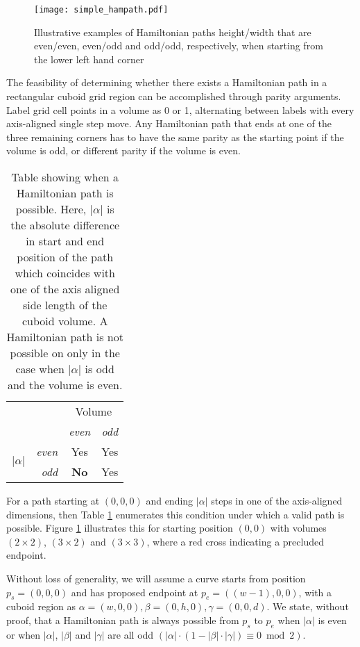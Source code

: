\begin{figure}[h]
  \centering
  \texttt{[image: simple\_hampath.pdf]}
  \caption{ Illustrative examples of Hamiltonian paths height/width that are even/even, even/odd and odd/odd, respectively,
            when starting from the lower left hand corner }
  \label{fig:exampleHampath}
\end{figure}


The feasibility of determining whether there exists a Hamiltonian path in a rectangular cuboid
grid region can be accomplished through parity arguments.
Label grid cell points in a volume as 0 or 1,
alternating between labels with every axis-aligned single step move.
Any Hamiltonian path that ends at one of the three remaining corners has to have the same parity as the starting point if the
volume is odd, or different parity if the volume is even.

\begin{table}[h]
  \centering
  \begin{tabular}[t]{cr|cc}
    \multicolumn{2}{c}{ \multirow{2}{*}{Path Possible} } & \multicolumn{2}{c}{Volume} \\
    & & \textit{even} & \textit{odd} \\
    \hline
      \multirow{2}{*}{ $|\alpha|$ } & \textit{even} & Yes & Yes \\
       & \textit{odd} & \textbf{No} & Yes \\
     \hline
  \end{tabular}
  \caption{ Table showing when a Hamiltonian path is possible. Here, $|\alpha|$ is the absolute difference in start and end position of the path which
            coincides with one of the axis aligned side length of the cuboid volume. A Hamiltonian path is not possible on only in the case
            when $|\alpha|$ is odd and the volume is even. }
  \label{table:pathTable}
\end{table}


For a path starting at $(0,0,0)$ and ending $|\alpha|$ steps in one of the axis-aligned dimensions,
then Table \ref{table:pathTable} enumerates this condition under which a valid path is possible.
Figure \ref{fig:exampleHampath} illustrates this for starting position $(0,0)$ with volumes $(2 \times 2)$, $(3 \times 2)$ and $(3 \times 3)$,
where a red cross indicating a precluded endpoint.

Without loss of generality, we will assume a curve starts from position $p_s=(0,0,0)$ and has proposed
endpoint at $p_e=((w-1),0,0)$, with a cuboid region as $\alpha = (w,0,0), \beta = (0,h,0), \gamma = (0,0,d)$.
We state, without proof, that
a Hamiltonian path is always possible from $p_s$ to $p_e$ when $|\alpha|$ is even or when $|\alpha|$, $|\beta|$ and $|\gamma|$
are all odd  $(|\alpha| \cdot (1 - |\beta| \cdot |\gamma|) \equiv 0 \bmod 2)$.

